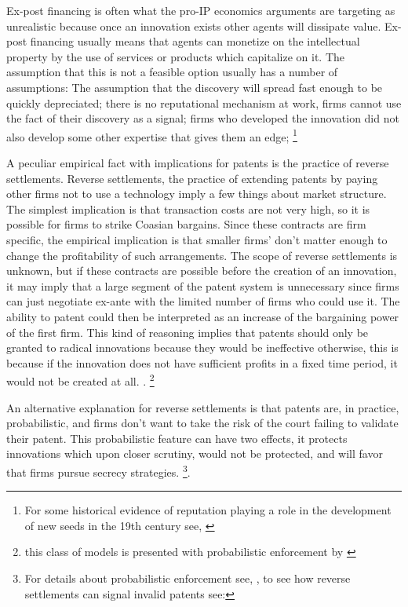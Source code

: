 \documentclass[12pt]{article}
\numberwithin{equation}{section}
\begin{document}
Ex-post financing is often what the pro-IP economics arguments are targeting as unrealistic because once an innovation exists other agents will dissipate value. Ex-post financing usually means that agents can monetize on the intellectual property by the use of services or products which capitalize on it. The assumption that this is not a feasible option usually has a number of assumptions: The assumption that the discovery will spread fast enough to be quickly depreciated; there is no reputational mechanism at work, firms cannot use the fact of their discovery as a signal; firms who developed the innovation did not also develop some other expertise that gives them an edge; \footnote{For some historical evidence of reputation playing a role in the development of new seeds in the 19th century see, \cite{charnley2013seeds}}

A peculiar empirical fact with implications for patents is the practice of reverse settlements. Reverse settlements, the practice of extending patents by paying other firms not to use a technology imply a few things about market structure. The simplest implication is that transaction costs are not very high, so it is possible for firms to strike Coasian bargains. Since these contracts are firm specific, the empirical implication is that smaller firms' don't matter enough to change the profitability of such arrangements. The scope of reverse settlements is unknown, but if these contracts are possible before the creation of an innovation, it may imply that a large segment of the patent system is unnecessary since firms can just negotiate ex-ante with the limited number of firms who could use it. The ability to patent could then be interpreted as an increase of the bargaining power of the first firm\cite{green1995division}. This kind of reasoning implies that patents should only be granted to radical innovations because they would be ineffective otherwise, this is because if the innovation does not have sufficient profits in a fixed time period, it would not be created at all. \cite{o1998patentability}. \footnote{this class of models is presented with probabilistic enforcement by \cite{chou2007division} }

An alternative explanation for reverse settlements is that patents are, in practice, probabilistic, and firms don't want to take the risk of the court failing to validate their patent. This probabilistic feature can have two effects, it protects innovations which upon closer scrutiny, would not be protected, and will favor that firms pursue secrecy strategies. \footnote{For details about probabilistic enforcement see, \cite{Lemley2005}, to see how reverse settlements can signal invalid patents see:\cite{Dolin2011}}.
\end{document}
